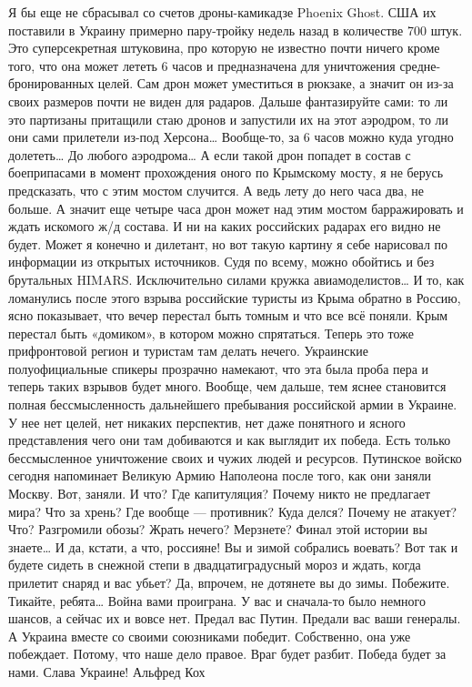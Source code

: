{Я бы еще не сбрасывал со счетов дроны-камикадзе Phoenix Ghost. США их поставили в Украину примерно пару-тройку недель назад в количестве 700 штук. Это суперсекретная штуковина, про которую не известно почти ничего кроме того, что она может лететь 6 часов и предназначена для уничтожения средне-бронированных целей. Сам дрон может уместиться в рюкзаке, а значит он из-за своих размеров почти не виден для радаров.
Дальше фантазируйте сами: то ли это партизаны притащили стаю дронов и запустили их на этот аэродром, то ли они сами прилетели из-под Херсона… Вообще-то, за 6 часов можно куда угодно долететь… До любого аэродрома… А если такой дрон попадет в состав с боеприпасами в момент прохождения оного по Крымскому мосту, я не берусь предсказать, что с этим мостом случится.
А ведь лету до него часа два, не больше. А значит еще четыре часа дрон может над этим мостом барражировать и ждать искомого ж/д состава. И ни на каких российских радарах его видно не будет. Может я конечно и дилетант, но вот такую картину я себе нарисовал по информации из открытых источников. Судя по всему, можно обойтись и без брутальных HIMARS. Исключительно силами кружка авиамоделистов…
И то, как ломанулись после этого взрыва российские туристы из Крыма обратно в Россию, ясно показывает, что вечер перестал быть томным и что все всё поняли. Крым перестал быть «домиком», в котором можно спрятаться. Теперь это тоже прифронтовой регион и туристам там делать нечего. Украинские полуофициальные спикеры прозрачно намекают, что эта была проба пера и теперь таких взрывов будет много.
Вообще, чем дальше, тем яснее становится полная бессмысленность дальнейшего пребывания российской армии в Украине. У нее нет целей, нет никаких перспектив, нет даже понятного и ясного представления чего они там добиваются и как выглядит их победа. Есть только бессмысленное уничтожение своих и чужих людей и ресурсов.
Путинское войско сегодня напоминает Великую Армию Наполеона после того, как они заняли Москву. Вот, заняли. И что? Где капитуляция? Почему никто не предлагает мира? Что за хрень? Где вообще — противник? Куда делся? Почему не атакует? Что? Разгромили обозы? Жрать нечего? Мерзнете? Финал этой истории вы знаете…
И да, кстати, а что, россияне! Вы и зимой собрались воевать? Вот так и будете сидеть в снежной степи в двадцатиградусный мороз и ждать, когда прилетит снаряд и вас убьет?
Да, впрочем, не дотянете вы до зимы. Побежите.
Тикайте, ребята…
Война вами проиграна.
У вас и сначала-то было немного шансов, а сейчас их и вовсе нет. Предал вас Путин. Предали вас ваши генералы.
А Украина вместе со своими союзниками победит. Собственно, она уже побеждает.
Потому, что наше дело правое. Враг будет разбит. Победа будет за нами.
Слава Украине!
Альфред Кох

}
